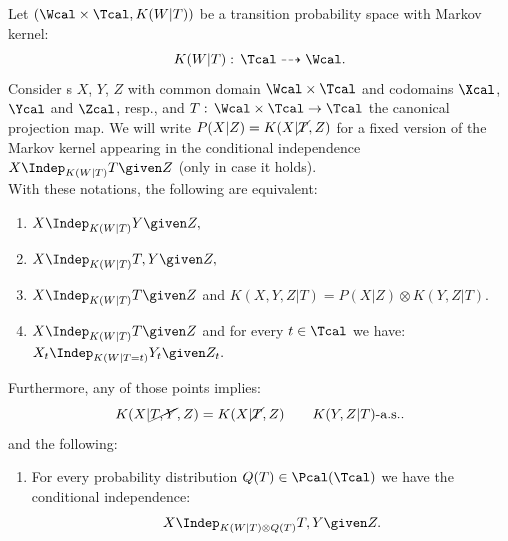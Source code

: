 \begin{Thm}
    \label{thm-ci-equivalences}
Let $(\Wcal \times \Tcal, K(W|T))$ be a transition probability space with Markov kernel:
\[K(W|T): \, \Tcal \dashrightarrow  \Wcal.\]
Consider \trv{}s $X$, $Y$, $Z$ with common domain $\Wcal\times \Tcal$ and codomains $\Xcal$, 
$\Ycal$ and $\Zcal$, resp., and $T:\,\Wcal\times \Tcal \to \Tcal$ the canonical projection map.
We will write $P(X|Z)=K(X|\cancel{T},Z)$ 
for a fixed version of the Markov kernel appearing in the conditional independence $X \Indep_{K(W|T)} T \given Z$ (only in case it holds).\\
With these notations, the following are equivalent:
\begin{enumerate}
    \item $\displaystyle X \Indep_{K(W|T)} Y \given Z,$
    \item $\displaystyle X \Indep_{K(W|T)} T, Y \given Z,$
    \item  $\displaystyle X \Indep_{K(W|T)} T \given Z$ and  $ \displaystyle K(X,Y,Z|T) = P(X|Z) \otimes K(Y,Z|T)$.
    \item  $\displaystyle  X \Indep_{K(W|T)} T \given Z$ and for every $t \in \Tcal$ we have:
            $\displaystyle X_t \Indep_{K(W|T=t)} Y_t \given Z_t.$
\end{enumerate}
Furthermore, any of those points implies:
\[ K(X|\cancel{T,Y},Z) = K(X|\cancel{T},Z) \qquad K(Y,Z|T)\text{-a.s.}.\]
and the following:
\begin{enumerate}[resume]
    \item For every probability distribution $Q(T) \in \Pcal(\Tcal)$ we have the conditional independence:
        \[ X \Indep_{K(W|T)\otimes Q(T) } T,Y \given Z.\]
\end{enumerate}
\end{Thm}
